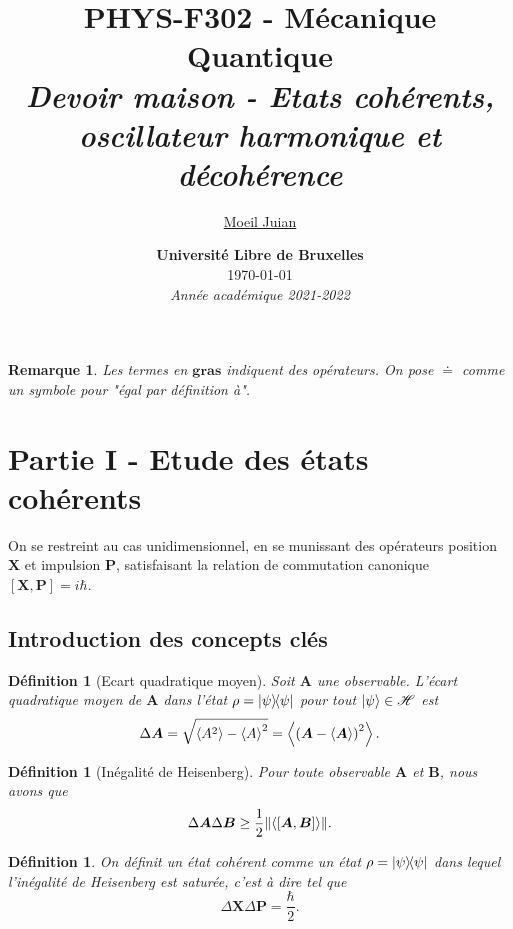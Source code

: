 \documentclass[11pt,oneside,a4paper]{article}
\title{%
  \textbf{PHYS-F302 - Mécanique Quantique} \\
  \textit{Devoir maison - Etats cohérents, oscillateur harmonique et décohérence}
}
\author{%
  \href{mailto:juian.moeil@ulb.be}{Moeil Juian}
}
\date{%
  \textbf{Université Libre de Bruxelles} \\
  \today \\
  \emph{Année académique 2021-2022}
}
\newcommand{\h}{\ensuremath{\hbar}}
\newtheorem{definition}[theorem]{Définition}
\newtheorem{remark}[theorem]{Remarque}
\begin{document}
\maketitle
\thispagestyle{empty}
\tableofcontents
\newpage

\begin{remark}
  Les termes en $\bm{gras}$ indiquent des opérateurs. On pose $\doteq$ comme un symbole pour "égal par définition à".
\end{remark}
\section{Partie I - Etude des états cohérents}
On se restreint au cas unidimensionnel, en se munissant des opérateurs position $\bm{X}$ et impulsion $\bm{P}$, satisfaisant la relation de commutation canonique $[\bm{X},\bm{P}] = i\h$.

\subsection*{Introduction des concepts clés}
\begin{definition}[Ecart quadratique moyen]
  Soit $\bm{A}$ une observable. L'écart quadratique moyen de $\bm{A}$ dans l'état $\rho = \ketbra{\psi}$ pour tout $\ket{\psi}\in\mathcal{H}$ est 
  \begin{equation}
    \label{ecart quadratique moyen}
    \Delta\bm{A} = \sqrt{\expval{A^2}-\expval{A}^2} = \expval{\left(\bm{A}-\expval{\bm{A}}\right)^2}.
  \end{equation}
\end{definition}

\begin{definition}[Inégalité de Heisenberg]
  Pour toute observable $\bm{A}$ et $\bm{B}$, nous avons que
  \begin{equation}
    \label{Heisenberg inequality}
    \Delta\bm{A}\Delta\bm{B}\geq\frac{1}{2}\norm{\expval{[\bm{A},\bm{B}]}}.
  \end{equation}
\end{definition}

\begin{definition}
  \label{def etat coherent saturation}
    On définit un état cohérent comme un état $\rho = \ketbra{\psi}$ dans lequel l'inégalité de Heisenberg est saturée, c'est à dire tel que
    \begin{equation}
      \Delta\bm{X}\Delta\bm{P} = \frac{\h}{2}.
    \end{equation} 
\end{definition}
\end{document}
